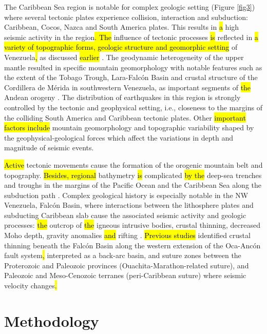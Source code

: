 \documentclass[sustainability,article,submit,pdftex,moreauthors]{Definitions/mdpi}
\begin{document}
The Caribbean Sea region is notable for complex geologic setting (Figure \ref{fig3}) where several tectonic plates experience collision, interaction and subduction: Caribbean, Cocos, Nazca and South America plates. This results in \hl{a }high seismic activity in the region\hl{. The} influence of tectonic processes\hl{ is }reflected in \hl{a variety of topographic forms, geologic structure and geomorphic setting} of\hl{ }Venezuela\hl{, }as\hl{ }discussed \hl{earlier } \citep{Diebold,Fajardo,Lemenkova2020b,Perez1981}. The geodynamic heterogeneity of the upper mantle resulted in specific mountain geomorphology with notable features such as the extent of the Tobago Trough, Lara-Falcón Basin and crustal structure of the Cordillera de Mérida in southwestern Venezuela, as important segments of \hl{the }Andean orogeny \cite{AVILAGARCIA2022103853}. 
The distribution of earthquakes in this region is strongly controlled by the tectonic and geophysical setting, i.e., closeness to the margins of the colliding South America and Caribbean tectonic plates. Other\hl{ important factors include} mountain geomorphology and topographic variability shaped by the geophysical-geological forces which affect the variations in depth and magnitude of seismic events. 

\hl{Active} tectonic movements cause the formation of the orogenic mountain belt and topography. \hl{Besides, regional }bathymetry \hl{is }complicated \hl{by the }deep-sea trenches and troughs in the margins of the Pacific Ocean and the Caribbean Sea along the subduction path \citep{Gough,Lemenkova2020a}. Complex geological history is especially notable in the NW Venezuela, Falcón Basin, where\hl{ }interactions between the lithosphere plates and subducting Caribbean slab cause the associated seismic activity and geologic processes: \hl{the }outcrop of \hl{the }igneous intrusive bodies, crustal thinning, decreased Moho depth, gravity anomalies \hl{and} rifting \cite{Bezada}. \hl{Previous studies }\cite{Mazuera} identified crustal thinning beneath the Falcón Basin along the western extension of the Oca-Ancón fault system\hl{, }interpreted as a back-arc basin, and suture zones between the Proterozoic and Paleozoic provinces (Ouachita-Marathon-related suture), and Paleozoic and Meso-Cenozoic terranes (peri-Caribbean suture) where seismic velocity changes\hl{.} 

\section{Methodology}
\end{document}
